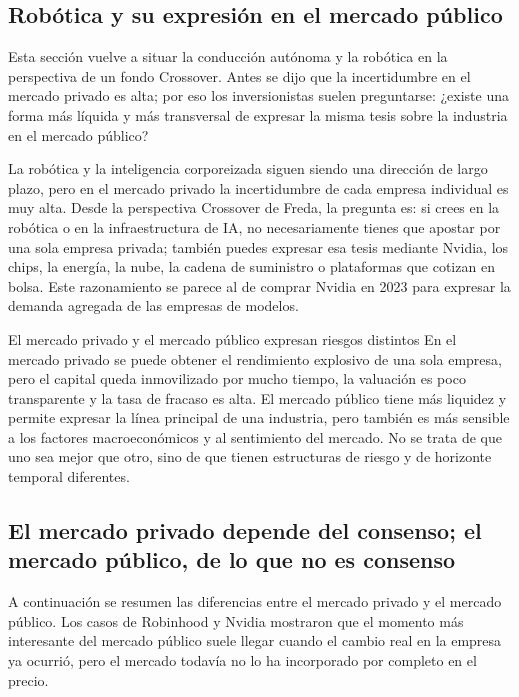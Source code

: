 \documentclass[a4paper]{article}
\begin{document}
\subsection{Robótica y su expresión en el mercado público}

Esta sección vuelve a situar la conducción autónoma y la robótica en la perspectiva de un fondo Crossover. Antes se dijo que la incertidumbre en el mercado privado es alta; por eso los inversionistas suelen preguntarse: ¿existe una forma más líquida y más transversal de expresar la misma tesis sobre la industria en el mercado público?

La robótica y la inteligencia corporeizada siguen siendo una dirección de largo plazo, pero en el mercado privado la incertidumbre de cada empresa individual es muy alta. Desde la perspectiva Crossover de Freda, la pregunta es: si crees en la robótica o en la infraestructura de IA, no necesariamente tienes que apostar por una sola empresa privada; también puedes expresar esa tesis mediante Nvidia, los chips, la energía, la nube, la cadena de suministro o plataformas que cotizan en bolsa. Este razonamiento se parece al de comprar Nvidia en 2023 para expresar la demanda agregada de las empresas de modelos.

\begin{warningbox}{El mercado privado y el mercado público expresan riesgos distintos}
En el mercado privado se puede obtener el rendimiento explosivo de una sola empresa, pero el capital queda inmovilizado por mucho tiempo, la valuación es poco transparente y la tasa de fracaso es alta. El mercado público tiene más liquidez y permite expresar la línea principal de una industria, pero también es más sensible a los factores macroeconómicos y al sentimiento del mercado. No se trata de que uno sea mejor que otro, sino de que tienen estructuras de riesgo y de horizonte temporal diferentes.
\end{warningbox}

\subsection{El mercado privado depende del consenso; el mercado público, de lo que no es consenso}

A continuación se resumen las diferencias entre el mercado privado y el mercado público. Los casos de Robinhood y Nvidia mostraron que el momento más interesante del mercado público suele llegar cuando el cambio real en la empresa ya ocurrió, pero el mercado todavía no lo ha incorporado por completo en el precio.
\end{document}

